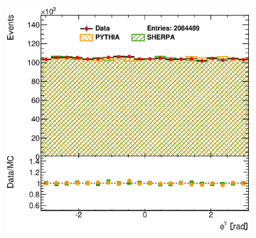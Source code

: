 \documentclass[12pt, twoside]{article}
\numberwithin{equation}{section}
\numberwithin{figure}{section}
\newenvironment{changemargin}[2]{%
\begin{list}{}{%
\setlength{\topsep}{0pt}%
\setlength{\leftmargin}{#1}%
\setlength{\rightmargin}{#2}%
\setlength{\listparindent}{\parindent}%
\setlength{\itemindent}{\parindent}%
\setlength{\parsep}{\parskip}%
}%
\item[]}{\end{list}}
\begin{document}
\begin{figure}
\begin{changemargin}{-1.0cm}{-0.75cm}
\begin{changemargin}{-0.75cm}{-1.0cm}
\begin{subfigure}[b]{0.37\textwidth}
            \subcaption{}
            \label{fig:DefaultEtaPhoton}
        \end{subfigure}
        \begin{subfigure}[b]{0.37\textwidth}
            \includegraphics[width=\textwidth]{./images/Results(Default)/DEF-103.eps}
            \subcaption{}
            \label{fig:DefaultPhiPhoton}
        \end{subfigure}


\end{changemargin}
\end{changemargin}
\end{figure}
\end{document}
